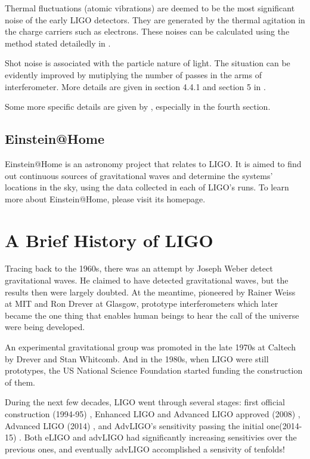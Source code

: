 \documentclass[aps,prl,preprint]{revtex4}
\begin{document}
Thermal fluctuations (atomic vibrations) are deemed to be the most significant noise of the early LIGO detectors. They are generated by the thermal agitation in the charge carriers such as electrons. These noises can be calculated using the method stated detailedly in \cite{thermal}.

Shot noise is associated with the particle nature of light. The situation can be evidently improved by mutiplying the number of passes in the arms of interferometer. More details are given in section 4.4.1 and section 5 in \cite{Noise}.

Some more specific details are given by \cite{Noise}, especially in the fourth section.

\subsection{Einstein@Home}
Einstein@Home is an astronomy project that relates to LIGO. It is aimed to find out continuous sources of gravitational waves and determine the systems' locations in the sky, using the data collected in each of LIGO's runs. To learn more about Einstein@Home, please visit its homepage. \cite{Einstein@Home}


\section{A Brief History of LIGO \label{history}}
Tracing back to the 1960s, there was an attempt by Joseph Weber detect gravitational waves. He claimed to have detected gravitational waves, but the results then were largely doubted. At the meantime, pioneered by Rainer Weiss at MIT and Ron Drever at Glasgow, prototype interferometers which later became the one thing that enables human beings to hear the call of the universe were being developed.

An experimental gravitational group was promoted in the late 1970s at Caltech by Drever and Stan Whitcomb. And in the 1980s, when LIGO were still prototypes, the US National Science Foundation started funding the construction of them.

During the next few decades, LIGO went through several stages: first official construction (1994-95) \cite{timeline}, Enhanced LIGO and Advanced LIGO approved (2008) \cite{BHLIGO}, Advanced LIGO (2014) \cite{timeline}, and AdvLIGO's sensitivity passing the initial one(2014-15) \cite{timeline}. Both eLIGO and advLIGO had significantly increasing sensitivies over the previous ones, and eventually advLIGO accomplished a sensivity of tenfolds! \cite{BHLIGO}
\end{document}
